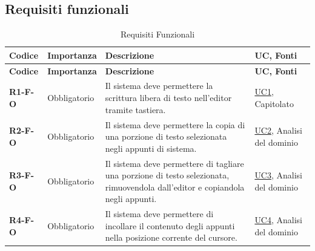 \subsection{Requisiti funzionali}
\renewcommand{\arraystretch}{1.5}
\begin{longtable}{|p{2.5cm}|p{2.2cm}|p{6.8cm}|p{2.7cm}|}
	\caption{Requisiti Funzionali} \\
	\hline
	\rowcolor{primarycolor!10}
	\textbf{Codice} & \textbf{Importanza} & \textbf{Descrizione} & \textbf{UC, Fonti} \\
	\hline
	\endfirsthead
	\hline
	\rowcolor{primarycolor!10}
	\textbf{Codice} & \textbf{Importanza} & \textbf{Descrizione} & \textbf{UC, Fonti} \\
	\hline
	\endhead

	\textbf{R1-F-O} & Obbligatorio & Il sistema deve permettere la scrittura libera di testo nell'editor tramite tastiera. & \hyperlink{uc1}{UC1}, Capitolato \\ \hline
	\textbf{R2-F-O} & Obbligatorio & Il sistema deve permettere la copia di una porzione di testo selezionata negli appunti di sistema. & \hyperlink{uc2}{UC2}, Analisi del dominio \\ \hline
	\textbf{R3-F-O} & Obbligatorio & Il sistema deve permettere di tagliare una porzione di testo selezionata, rimuovendola dall'editor e copiandola negli appunti. & \hyperlink{uc3}{UC3}, Analisi del dominio \\ \hline
	\textbf{R4-F-O} & Obbligatorio & Il sistema deve permettere di incollare il contenuto degli appunti nella posizione corrente del cursore. & \hyperlink{uc4}{UC4}, Analisi del dominio \\ \hline


\end{longtable}
